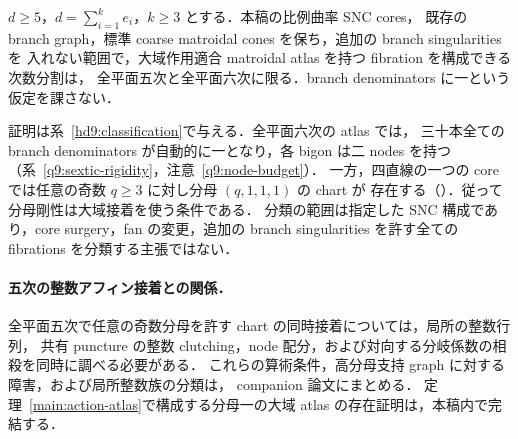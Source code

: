 \begin{theorem}\label{main:atlas-classification}
$d\ge5$，$d=\sum_{i=1}^ke_i$，$k\ge3$ とする．本稿の比例曲率 SNC cores，
既存の branch graph，標準 coarse matroidal cones を保ち，追加の branch singularities を
入れない範囲で，大域作用適合 matroidal atlas を持つ fibration を構成できる次数分割は，
全平面五次と全平面六次に限る．branch denominators に一という仮定を課さない．
\end{theorem}

証明は系~\ref{hd9:classification}で与える．全平面六次の atlas では，
三十本全ての branch denominators が自動的に一となり，各 bigon は二 nodes を持つ
（系~\ref{q9:sextic-rigidity}，注意~\ref{q9:node-budget}）．
一方，四直線の一つの core では任意の奇数 $q\ge3$ に対し分母 $(q,1,1,1)$ の chart が
存在する（\cite{QuinticArithmetic}）．従って分母剛性は大域接着を使う条件である．
分類の範囲は指定した SNC 構成であり，core surgery，fan の変更，追加の branch singularities
を許す全ての fibrations を分類する主張ではない．

\paragraph{五次の整数アフィン接着との関係．}
全平面五次で任意の奇数分母を許す chart の同時接着については，局所の整数行列，
共有 puncture の整数 clutching，node 配分，および対向する分岐係数の相殺を同時に調べる必要がある．
これらの算術条件，高分母支持 graph に対する障害，および局所整数族の分類は，
companion 論文\cite{QuinticArithmetic}にまとめる．
定理~\ref{main:action-atlas}で構成する分母一の大域 atlas の存在証明は，本稿内で完結する．
